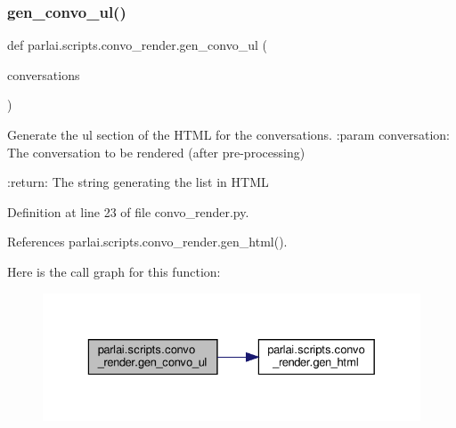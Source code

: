 \subsubsection{\texorpdfstring{gen\+\_\+convo\+\_\+ul()}{gen\_convo\_ul()}}
{\footnotesize\ttfamily def parlai.\+scripts.\+convo\+\_\+render.\+gen\+\_\+convo\+\_\+ul (\begin{DoxyParamCaption}\item[{}]{conversations }\end{DoxyParamCaption})}

\begin{DoxyVerb}Generate the ul section of the HTML for the conversations.
:param conversation: The conversation to be rendered (after pre-processing)

:return: The string generating the list in HTML
\end{DoxyVerb}
 

Definition at line 23 of file convo\+\_\+render.\+py.



References parlai.\+scripts.\+convo\+\_\+render.\+gen\+\_\+html().

Here is the call graph for this function\+:
\nopagebreak
\begin{figure}[H]
\begin{center}
\leavevmode
\includegraphics[width=329pt]{namespaceparlai_1_1scripts_1_1convo__render_a8c393321c36d1cafceb86aa3f7431c4c_cgraph}
\end{center}
\end{figure}
\mbox{\label{namespaceparlai_1_1scripts_1_1convo__render_ad23695f4d64e7dbd1fee801098d570b2}} 
